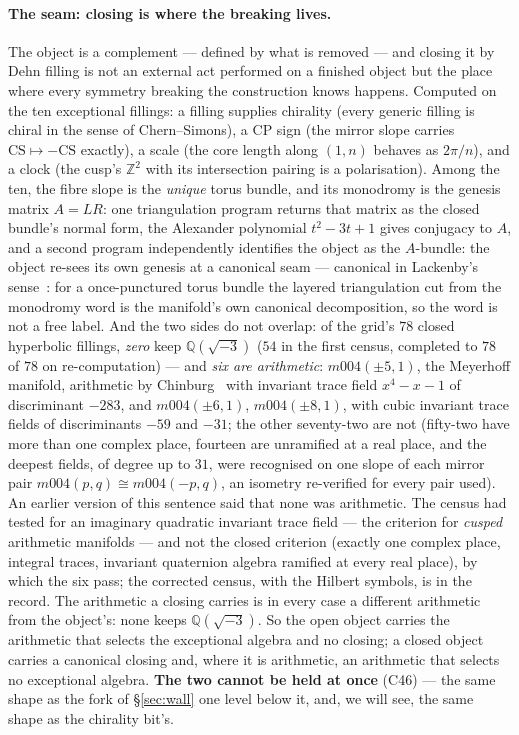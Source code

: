 \documentclass[11pt,a4paper]{article}
\theoremstyle{definition}
\theoremstyle{remark}
\newcommand{\Q}{\mathbb{Q}}
\newcommand{\Z}{\mathbb{Z}}
\begin{document}
\paragraph{The seam: closing is where the breaking lives.} The object is a complement --- defined by what is removed ---
and closing it by Dehn filling is not an external act performed on a finished object but the place where every symmetry
breaking the construction knows happens. Computed on the ten exceptional fillings: a filling supplies chirality (every
generic filling is chiral in the sense of Chern--Simons), a CP sign (the mirror slope carries $\mathrm{CS} \mapsto
-\mathrm{CS}$ exactly), a scale (the core length along $(1,n)$ behaves as $2\pi/n$), and a clock (the cusp's $\Z^2$ with its
intersection pairing is a polarisation). Among the ten, the fibre slope is the \emph{unique} torus bundle, and its monodromy
is the genesis matrix $A = LR$: one triangulation program returns that matrix as the closed bundle's normal form, the Alexander
polynomial $t^2 - 3t + 1$ gives conjugacy to $A$, and a second program independently identifies the object as the $A$-bundle:
the object re-sees its own genesis at a canonical seam --- canonical in Lackenby's sense~\cite{lackenby}: for a once-punctured torus bundle the layered triangulation cut from the monodromy word is the manifold's own canonical decomposition, so the word is not a free label. And the two sides do not overlap: of the grid's $78$
closed hyperbolic fillings, \emph{zero} keep $\Q(\sqrt{-3})$ ($54$ in the first census, completed to $78$ of $78$ on
re-computation) --- and \emph{six are arithmetic}: $m004(\pm5,1)$, the Meyerhoff manifold, arithmetic by Chinburg~\cite{chinburg}
with invariant trace field $x^4 - x - 1$ of discriminant $-283$, and $m004(\pm6,1)$, $m004(\pm8,1)$, with cubic invariant trace
fields of discriminants $-59$ and $-31$; the other seventy-two are not (fifty-two have more than one complex place, fourteen
are unramified at a real place, and the deepest fields, of degree up to $31$, were recognised on one slope of each mirror pair
$m004(p,q) \cong m004(-p,q)$, an isometry re-verified for every pair used). An earlier version of this sentence said that none was
arithmetic. The census had tested for an imaginary quadratic invariant trace field --- the criterion for \emph{cusped}
arithmetic manifolds --- and not the closed criterion (exactly one complex place, integral traces, invariant quaternion
algebra ramified at every real place), by which the six pass; the corrected census, with the Hilbert symbols, is in the record.
The arithmetic a closing carries is in every case a different arithmetic from the object's: none keeps $\Q(\sqrt{-3})$. So the open object carries the
arithmetic that selects the exceptional algebra and no closing; a closed object carries a canonical closing and, where it is
arithmetic, an arithmetic that selects no exceptional algebra. \textbf{The two cannot be held at once} (C46) --- the same shape as the fork of \S\ref{sec:wall} one
level below it, and, we will see, the same shape as the chirality bit's.
\end{document}
